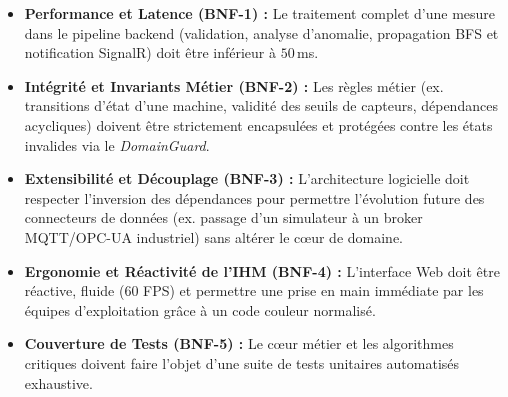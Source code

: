 \begin{itemize}
    \item \textbf{Performance et Latence (BNF-1) :} Le traitement complet d'une mesure dans le pipeline backend (validation, analyse d'anomalie, propagation BFS et notification SignalR) doit être inférieur à $50$\,ms.
    \item \textbf{Intégrité et Invariants Métier (BNF-2) :} Les règles métier (ex. transitions d'état d'une machine, validité des seuils de capteurs, dépendances acycliques) doivent être strictement encapsulées et protégées contre les états invalides via le \textit{DomainGuard}.
    \item \textbf{Extensibilité et Découplage (BNF-3) :} L'architecture logicielle doit respecter l'inversion des dépendances pour permettre l'évolution future des connecteurs de données (ex. passage d'un simulateur à un broker MQTT/OPC-UA industriel) sans altérer le cœur de domaine.
    \item \textbf{Ergonomie et Réactivité de l'IHM (BNF-4) :} L'interface Web doit être réactive, fluide (60 FPS) et permettre une prise en main immédiate par les équipes d'exploitation grâce à un code couleur normalisé.
    \item \textbf{Couverture de Tests (BNF-5) :} Le cœur métier et les algorithmes critiques doivent faire l'objet d'une suite de tests unitaires automatisés exhaustive.
\end{itemize}
